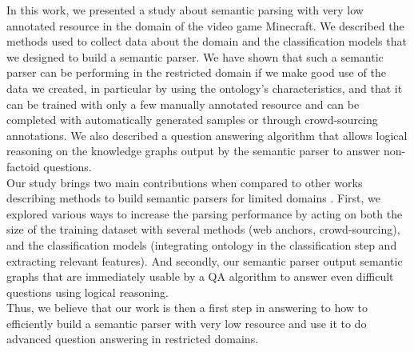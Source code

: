\documentclass[12pt]{article}
\begin{document}
In this work, we presented a study about semantic parsing with very low annotated resource in the domain of the video game Minecraft.
We described the methods used to collect data about the domain and the classification models that we designed to build a semantic parser.
We have shown that such a semantic parser can be performing in the restricted domain if we make good use of the data we created, in particular by using the ontology's characteristics, and that it can be trained with only a few manually annotated resource and can be completed with automatically generated samples or through crowd-sourcing annotations.
We also described a question answering algorithm that allows logical reasoning on the knowledge graphs output by the semantic parser to answer non-factoid questions.\\
Our study brings two main contributions when compared to other works describing methods to build semantic parsers for limited domains \cite{wang2015building}. First, we explored various ways to increase the parsing performance by acting on both the size of the training dataset with several methods (web anchors, crowd-sourcing), and the classification models (integrating ontology in the classification step and extracting relevant features). And secondly, our semantic parser output semantic graphs that are immediately usable by a QA algorithm to answer even difficult questions using logical reasoning.\\
Thus, we believe that our work is then a first step in answering to how to efficiently build a semantic parser with very low resource and use it to do advanced question answering in restricted domains.\\
\end{document}
